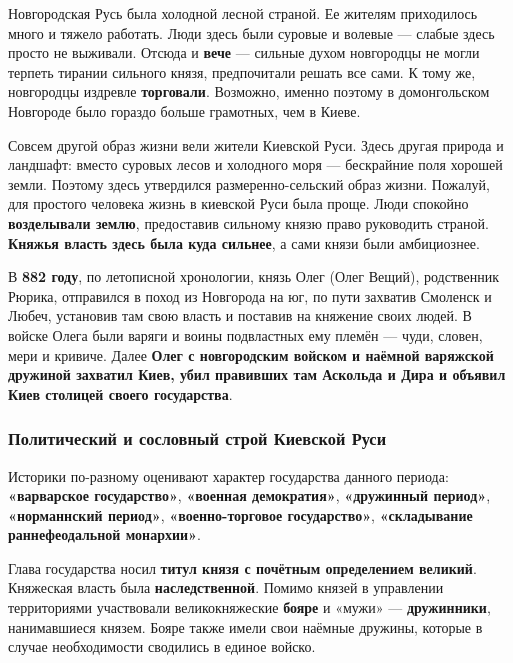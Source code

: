 \documentclass{article}
\begin{document}
Новгородская Русь была холодной лесной страной. Ее жителям приходилось много и тяжело работать. Люди здесь были суровые и волевые — слабые здесь просто не выживали. Отсюда и \textbf{вече} — сильные духом новгородцы не могли терпеть тирании сильного князя, предпочитали решать все сами. К тому же, новгородцы издревле \textbf{торговали}. Возможно, именно поэтому в домонгольском Новгороде было гораздо больше грамотных, чем в Киеве.

\hfill

Совсем другой образ жизни вели жители Киевской Руси. Здесь другая природа и ландшафт: вместо суровых лесов и холодного моря — бескрайние поля хорошей земли. Поэтому здесь утвердился размеренно-сельский образ жизни. Пожалуй, для простого человека жизнь в киевской Руси была проще. Люди спокойно \textbf{возделывали землю}, предоставив сильному князю право руководить страной. \textbf{Княжья власть здесь была куда сильнее}, а сами князи были амбициознее.

\hfill

В \textbf{882 году}, по летописной хронологии, князь Олег (Олег Вещий), родственник Рюрика, отправился в поход из Новгорода на юг, по пути захватив Смоленск и Любеч, установив там свою власть и поставив на княжение своих людей. В войске Олега были варяги и воины подвластных ему племён — чуди, словен, мери и кривиче. Далее \textbf{Олег с новгородским войском и наёмной варяжской дружиной захватил Киев, убил правивших там Аскольда и Дира и объявил Киев столицей своего государства}.

\subsubsection{Политический и сословный строй Киевской Руси}

Историки по-разному оценивают характер государства данного периода: \textbf{«варварское государство»}, \textbf{«военная демократия»}, \textbf{«дружинный период»}, \textbf{«норманнский период»}, \textbf{«военно-торговое государство»}, \textbf{«складывание раннефеодальной монархии»}.

\hfill

Глава государства носил \textbf{титул князя с почётным определением великий}. Княжеская власть была \textbf{наследственной}. Помимо князей в управлении территориями участвовали великокняжеские \textbf{бояре} и «мужи» — \textbf{дружинники}, нанимавшиеся князем. Бояре также имели свои наёмные дружины, которые в случае необходимости сводились в единое войско.
\end{document}
